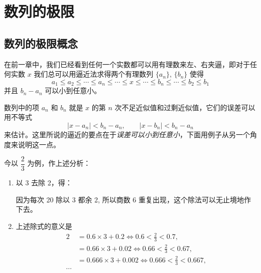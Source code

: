 \chapter{数列的极限}

\section{数列的极限概念}
在前一章中，我们已经看到任何一个实数都可以用有理数来左、右夹逼，即对于任何实数 $x$ 我们总可以用逼近法求得两个有理数列 $\{a_n\}$, $\{b_n\}$ 使得
\[a_1\leqslant a_2\leqslant \cdots \leqslant a_n\leqslant \cdots\leqslant x\leqslant \cdots\leqslant b_n\leqslant \cdots\leqslant b_2\leqslant b_1\]
并且 $b_n-a_n$ 可以小到任意小。

数列中的项 $a_n$ 和 $b_n$ 就是 $x$ 的第 $n$ 次不足近似值和过剩近似值，它们的误差可以用不等式
\[|x-a_n|<b_n-a_n,\qquad |x-b_n|<b_n-a_n\]
来估计。这里所说的逼近的要点在于\emph{误差可以小到任意小}，下面用例子从另一个角度来说明这一点。

\medskip
今以 $\dfrac{2}{3}$ 为例，作上述分析：

\medskip
\begin{enumerate}
  \item 以 3 去除 2，得：
    \begin{center}
    \end{center}
    因为每次 20 除以 3 都余 2, 所以商数 6 重复出现，这个除法可以无止境地作下去。
    \item 上述除式的意义是
\[\begin{split}
    2&=0.6\times3+0.2\Longleftrightarrow 0.6<\frac{2}{3}<0.7,\\
&=0.66\times3+0.02\Longleftrightarrow 0.66<\frac{2}{3}<0.67,\\
&=0.666\times3+0.002\Longleftrightarrow 0.666<\frac{2}{3}<0.667,\\
\cdots 
\end{split}\]
\end{enumerate}

